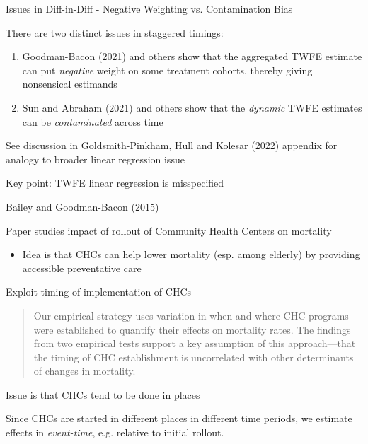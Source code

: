 \documentclass[notes,11pt, aspectratio=169]{beamer}
\newenvironment{wideitemize}{\itemize\addtolength{\itemsep}{10pt}}{\enditemize}
\begin{document}
\begin{frame}{Issues in Diff-in-Diff - Negative Weighting vs. Contamination Bias}
	\begin{wideitemize}
		\item There are two distinct issues in staggered timings:
		\begin{enumerate}
			\item Goodman-Bacon (2021) and others show that the aggregated
			      TWFE estimate can put \emph{negative} weight on some treatment
			      cohorts, thereby giving nonsensical estimands
			\item Sun and Abraham (2021) and others show that the
			      \emph{dynamic} TWFE estimates can be \emph{contaminated} across
			      time
		\end{enumerate}
		\item See discussion in Goldsmith-Pinkham, Hull and Kolesar (2022)
		appendix for analogy to broader linear regression issue
		\item Key point: TWFE linear regression is misspecified
	\end{wideitemize}
\end{frame}


\begin{frame}{Bailey and Goodman-Bacon (2015)}
	\begin{wideitemize}
		\item Paper studies  impact of rollout of Community Health Centers on mortality
		\begin{itemize}
			\item Idea is that CHCs can help lower mortality (esp. among
			      elderly) by providing accessible preventative care
		\end{itemize}
		\item Exploit timing of implementation of CHCs
		\begin{quote}
			Our empirical strategy uses variation in when and where CHC
			programs were established to quantify their effects on
			mortality rates. The findings from two empirical tests support
			a key assumption of this approach—that the timing of CHC
			establishment is uncorrelated with other determinants of
			changes in mortality.
		\end{quote}
		\item Issue is that CHCs tend to be done in places
		\item Since CHCs are started in different places in different time
		periods, we estimate effects in \emph{event-time}, e.g. relative
		to initial rollout.
	\end{wideitemize}
\end{frame}
\end{document}
